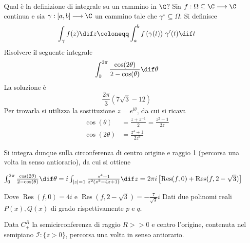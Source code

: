     Qual è la definizione di integrale su un cammino in $ \C $?
Sia $ f:\Omega \subseteq \C \longrightarrow \C $ continua e sia $ \gamma:[a,b]\longrightarrow \C $ un cammino tale che $ \gamma^{\star} \subseteq \Omega $. Si definisce \[
    \int_{\gamma}f(z)\dif z \coloneqq \int_{a}^{b} f\left(\gamma(t)\right)  \,\gamma'(t)\dif t
\]
    Risolvere il seguente integrale \[\int_0^{2 \pi} \frac{\cos(2\theta)}{2 - \cos(\theta)}\dif \theta\]
    La soluzione è \[
        \frac{2 \pi}{3}(7 \sqrt{3} -12 )
    \]Per trovarla si utilizza la sostituzione $z = e^{i \theta}$, da cui si ricava
    \begin{align*}
        \cos(\theta) &= \frac{z + z^{-1}}{2} = \frac{z^2+1}{2z}\\
        \cos(2\theta) &= \frac{z^4+1}{2z^2}
    \end{align*}

    Si integra dunque sulla circonferenza di centro origine e raggio 1 (percorsa una volta in senso antiorario), da cui si ottiene

        $\int_0^{2 \pi} \frac{\cos(2\theta)}{2 - \cos(\theta)}\dif \theta = i \int_{|z| = 1} \frac{z^4+1}{z^2(z^2-4z+1)} \dif z = 2 \pi i \left[ \operatorname{Res}(f,0) + \operatorname{Res}(f,2-\sqrt{3}) \right]$

    Dove $\operatorname{Res}(f,0) = 4i$ e $ \operatorname{Res}(f,2-\sqrt{3}) = -\frac{7}{\sqrt{3}}i $
Dati due polinomi reali $P(x), Q(x)$ di grado rispettivamente $p$ e $q$. 
    
Data $C^{R}_{+}$ la semicirconferenza di raggio $R>>0$ e centro l'origine, contenuta nel semipiano $\mathcal{I}:\{z>0\}$, percorsa una volta in senso antiorario. 

